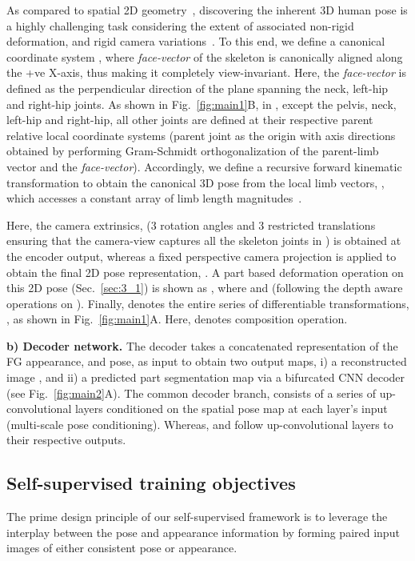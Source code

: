 As compared to spatial 2D geometry~\cite{rhodin2018unsupervised,lorenz2019unsupervised}, discovering the inherent 3D human pose is a highly challenging task considering the extent of associated non-rigid deformation, and rigid camera variations~\cite{akhter2015pose,kundu2019unsupervised}. To this end, we define a canonical coordinate system , where \textit{face-vector} of the skeleton is canonically aligned along the +ve X-axis, thus making it completely view-invariant. Here, the \textit{face-vector} is defined as the perpendicular direction of the plane spanning the neck, left-hip and right-hip joints. As shown in Fig.~\ref{fig:main1}{\color{red}B}, in , except the pelvis, neck, left-hip and right-hip, all other joints are defined at their respective parent relative local coordinate systems (\ie parent joint as the origin with axis directions obtained by performing Gram-Schmidt orthogonalization of the parent-limb vector and the \textit{face-vector}). Accordingly, we define a recursive forward kinematic transformation  to obtain the canonical 3D pose from the local limb vectors, \ie , which accesses a constant array of limb length magnitudes~\cite{zhou2016deep}. 


Here, the camera extrinsics,  (3 rotation angles and 3 restricted translations ensuring that the camera-view captures all the skeleton joints in ) is obtained at the encoder output, whereas a fixed perspective camera projection is applied to obtain the final 2D pose representation, \ie . A part based deformation operation on this 2D pose  (Sec.~\ref{sec:3_1}) is shown as , where  and  (following the depth aware operations on ). Finally,  denotes the entire series of differentiable transformations, \ie , as shown in Fig.~\ref{fig:main1}{\color{red}A}. Here,  denotes composition operation.


\noindent
\textbf{b) Decoder network.} The decoder takes a concatenated representation of the FG appearance,  and pose,  as input to obtain two output maps, i) a reconstructed image , and ii) a predicted part segmentation map  via a bifurcated CNN decoder (see Fig.~\ref{fig:main2}{\color{red}A}). The common decoder branch,  consists of a series of up-convolutional layers conditioned on the spatial pose map  at each layer's input (\ie multi-scale pose conditioning).
Whereas,  and  follow up-convolutional layers to their respective outputs. 

\subsection{Self-supervised training objectives}\label{sec:3_3}
The prime design principle of our self-supervised framework is to leverage the interplay between the pose and appearance information by forming paired input images of either consistent pose or appearance. 

